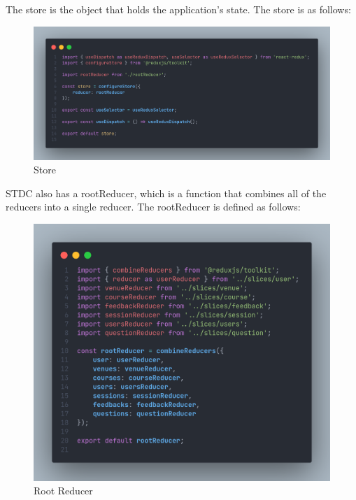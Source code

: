 \begin{justify}
        \vspace{0.25cm}
        \newendline The store is the object that holds the application's state. The store is as follows:

        \begin{figure}[H]
            \centerline{\includegraphics[width=140mm,scale=1]{figures/implementation_and_testing/implementation/frontend/store.png}}
            \caption{Store}
        \end{figure}

        \vspace{0.25cm}
        \newendline STDC also has a rootReducer, which is a function that combines all of the reducers into a single reducer. The rootReducer is defined as follows:

        \begin{figure}[H]
            \centerline{\includegraphics[width=150mm,scale=1]{figures/implementation_and_testing/implementation/frontend/rootReducer.png}}
            \caption{Root Reducer}
        \end{figure}


\end{justify}

